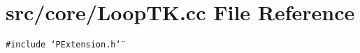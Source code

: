 \section{src/core/Loop\-TK.cc File Reference}
\label{LoopTK_8cc}


{\tt \#include \char`\"{}PExtension.h\char`\"{}}\par
